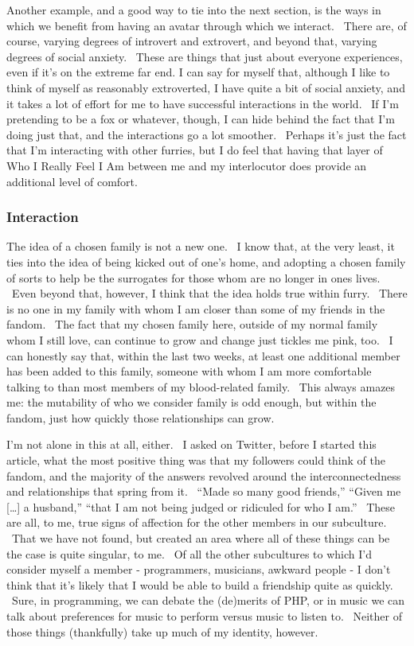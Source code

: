 Another example, and a good way to tie into the next section, is the
ways in which we benefit from having an avatar through which we
interact. ~There are, of course, varying degrees of introvert and
extrovert, and beyond that, varying degrees of social anxiety. ~These
are things that just about everyone experiences, even if it's on the
extreme far end. I can say for myself that, although I like to think of
myself as reasonably extroverted, I have quite a bit of social anxiety,
and it takes a lot of effort for me to have successful interactions in
the world. ~If I'm pretending to be a fox or whatever, though, I can
hide behind the fact that I'm doing just that, and the interactions go a
lot smoother. ~Perhaps it's just the fact that I'm interacting with
other furries, but I do feel that having that layer of Who I Really Feel
I Am between me and my interlocutor does provide an additional level of
comfort.

\subsubsection{Interaction}\label{interaction}

The idea of a chosen family is not a new one. ~I know that, at the very
least, it ties into the idea of being kicked out of one's home, and
adopting a chosen family of sorts to help be the surrogates for those
whom are no longer in ones lives. ~Even beyond that, however, I think
that the idea holds true within furry. ~There is no one in my family
with whom I am closer than some of my friends in the fandom. ~The fact
that my chosen family here, outside of my normal family whom I still
love, can continue to grow and change just tickles me pink, too. ~I can
honestly say that, within the last two weeks, at least one additional
member has been added to this family, someone with whom I am more
comfortable talking to than most members of my blood-related family.
~This always amazes me: the mutability of who we consider family is odd
enough, but within the fandom, just how quickly those relationships can
grow.

I'm not alone in this at all, either. ~I asked on Twitter, before I
started this article, what the most positive thing was that my followers
could think of the fandom, and the majority of the answers revolved
around the interconnectedness and relationships that spring from it.
~``Made so many good friends,'' ``Given me {[}\ldots{}{]} a husband,''
``that I am not being judged or ridiculed for who I am.'' ~These are
all, to me, true signs of affection for the other members in our
subculture. ~That we have not found, but created an area where all of
these things can be the case is quite singular, to me. ~Of all the other
subcultures to which I'd consider myself a member - programmers,
musicians, awkward people - I don't think that it's likely that I would
be able to build a friendship quite as quickly. ~Sure, in programming,
we can debate the (de)merits of PHP, or in music we can talk about
preferences for music to perform versus music to listen to. ~Neither of
those things (thankfully) take up much of my identity, however.

